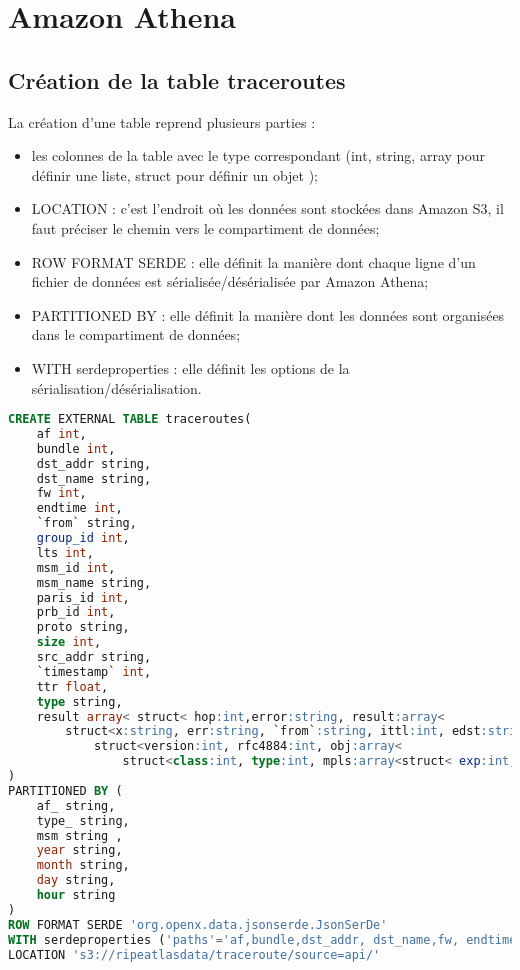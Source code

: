 \appendix

\chapter{Amazon Athena } \label{athena-appendix}

\section{Création de la table traceroutes } \label{creer-table-traceroute}
La création d'une table reprend plusieurs parties :
\begin{itemize}
	\item les colonnes de la table avec le type correspondant (int, string, array pour définir une liste, struct pour définir un objet );
	\item LOCATION : c'est l'endroit où les données sont stockées dans Amazon S3, il faut préciser le chemin vers le compartiment de données;
	\item ROW FORMAT SERDE : elle définit la manière dont chaque ligne d'un fichier de données est sérialisée/désérialisée par Amazon Athena;
	\item PARTITIONED BY : elle définit la manière dont les données sont organisées dans le compartiment de données; 
	\item WITH serdeproperties : elle définit les options de la sérialisation/désérialisation.
\end{itemize}
\begin{lstlisting}[language=SQL, basicstyle=\footnotesize,]
CREATE EXTERNAL TABLE traceroutes(
	af int,
	bundle int,
	dst_addr string,
	dst_name string,
	fw int,
	endtime int,
	`from` string,
	group_id int,
	lts int,
	msm_id int,
	msm_name string,
	paris_id int,
	prb_id int,
	proto string,
	size int,
	src_addr string,
	`timestamp` int,
	ttr float,
	type string,
    result array< struct< hop:int,error:string, result:array<
        struct<x:string, err:string, `from`:string, ittl:int, edst:string, late:int, mtu:int, rtt:float, size:int, ttl:int , flags:string, dstoptsize:int, hbhoptsize:int, icmpext:
        	struct<version:int, rfc4884:int, obj:array< 
        		struct<class:int, type:int, mpls:array<struct< exp:int, label:int, s:int, ttl:int>>>>>>>>> 
)
PARTITIONED BY (
	af_ string,
	type_ string,
	msm string ,
	year string,
	month string,
	day string,
	hour string
) 
ROW FORMAT SERDE 'org.openx.data.jsonserde.JsonSerDe'
WITH serdeproperties ('paths'='af,bundle,dst_addr, dst_name,fw, endtime, from, lts, msm_id, paris_id, prb_id, proto, size, src_addr, timestamp, type,fw, msm_name' ) 
LOCATION 's3://ripeatlasdata/traceroute/source=api/'
\end{lstlisting}

